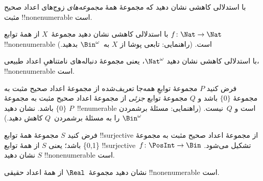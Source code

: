 \documentclass[../../../include/open-logic-section]{subfiles}
\begin{document}
\begin{prob}
با استدلالی کاهشی نشان دهید که مجموعهٔ همهٔ \emph{مجموعه‌های} زوج‌های
اعداد صحیح مثبت !!{nonenumerable} است.
\end{prob}

\begin{prob}\label{sfr:siz:red:prob:nat-nat}
  با استدلالی کاهشی نشان دهید مجموعهٔ~$X$ از همهٔ توابع
  $f\colon \Nat \to \Nat$ !!{nonenumerable} است. (راهنمایی: تابعی پوشا
  از $X$ به~$\Bin^\omega$ بدهید.)
\end{prob}

\begin{prob}
با استدلالی کاهشی نشان دهید $\Nat^\omega$، یعنی مجموعهٔ دنباله‌های
نامتناهیِ اعداد طبیعی، !!{nonenumerable} است.
\end{prob}

\begin{prob}
فرض کنید $P$ مجموعهٔ توابعِ همه‌جا تعریف‌شده از مجموعهٔ اعداد صحیح مثبت به مجموعهٔ
$\{0\}$ باشد و $Q$ مجموعهٔ توابع \emph{جزئی} از مجموعهٔ اعداد صحیح
مثبت به مجموعهٔ $\{0\}$ باشد. نشان دهید $P$~!!{enumerable} است و
$Q$~نیست. (راهنمایی: مسئلهٔ برشمردن $\Bin^\omega$ را به مسئلهٔ
برشمردن~$Q$ کاهش دهید.)
\end{prob}

\begin{prob}
فرض کنید $S$ مجموعهٔ همهٔ توابع !!{surjective} از مجموعهٔ اعداد صحیح
مثبت به مجموعهٔ \{0,1\} باشد؛ یعنی $S$ از همهٔ توابع
!!{surjective}~$f\colon \PosInt \to \Bin$ تشکیل می‌شود. نشان دهید $S$
!!{nonenumerable} است.
\end{prob}

\begin{prob}
نشان دهید مجموعهٔ~$\Real$ از همهٔ اعداد حقیقی !!{nonenumerable} است.
\end{prob}
\end{document}
